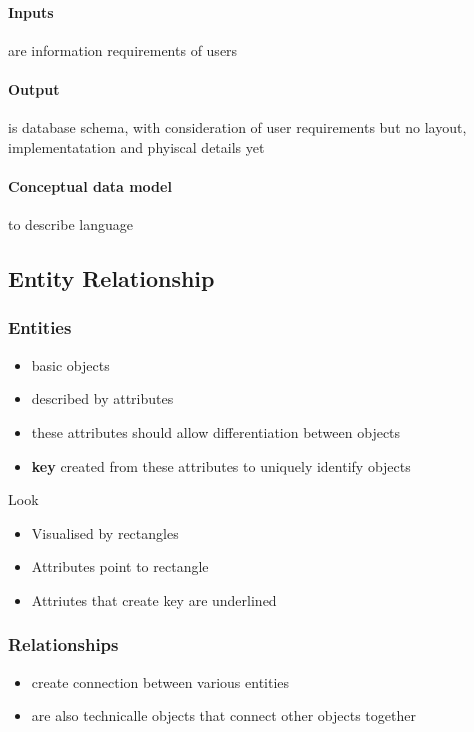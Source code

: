 \documentclass{article}
\begin{document}
			\paragraph{Inputs} are information requirements of users
			\paragraph{Output} is database schema, with consideration of user requirements but no layout, implementatation and phyiscal details yet
			\paragraph{Conceptual data model} to describe language

	\subsection{Entity Relationship}
		\subsubsection{Entities}
			\begin{itemize}
				\item basic objects
				\item described by attributes
				\item these attributes should allow differentiation between objects
				\item \textbf{key} created from these attributes to uniquely identify objects
			\end{itemize}

			Look
			\begin{itemize}
				\item Visualised by rectangles
				\item Attributes point to rectangle
				\item Attriutes that create key are underlined
			\end{itemize}

		\subsubsection{Relationships}
			\begin{itemize}
				\item create connection between various entities
				\item are also technicalle objects that connect other objects together
			\end{itemize}
\end{document}
